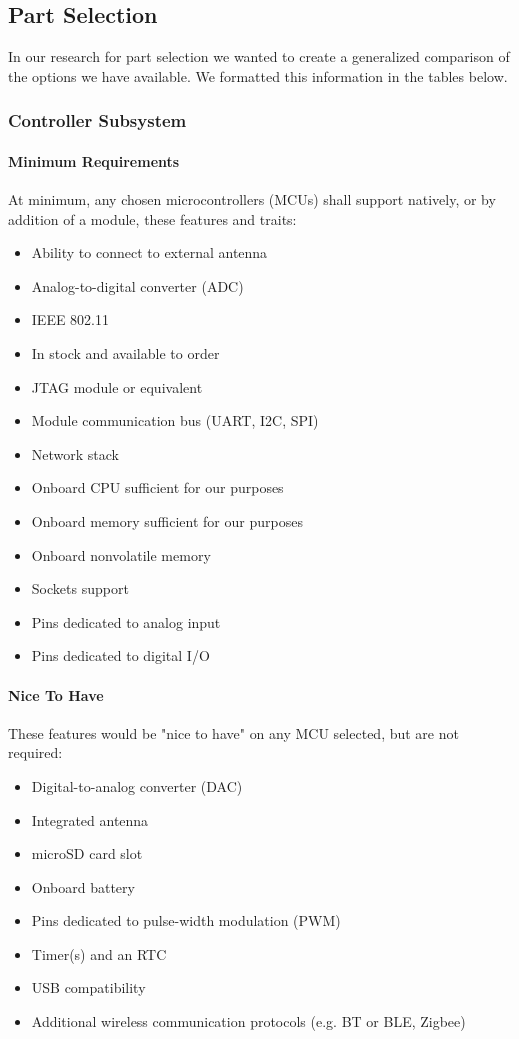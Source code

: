 \subsection{Part Selection}
In our research for part selection we wanted to create a generalized comparison of the options we have available. We formatted this information in the tables below.

\subsubsection{Controller Subsystem}\label{sec:ps-control}
\paragraph{Minimum Requirements} At minimum, any chosen microcontrollers (MCUs) shall support natively, or by addition of a module, these features and traits:
\begin{itemize}
	\item Ability to connect to external antenna
	\item Analog-to-digital converter (ADC)
	\item IEEE 802.11
	\item In stock and available to order
	\item JTAG module or equivalent
	\item Module communication bus (UART, I2C, SPI)
	\item Network stack
	\item Onboard CPU sufficient for our purposes
	\item Onboard memory sufficient for our purposes
	\item Onboard nonvolatile memory
	\item Sockets support
	\item Pins dedicated to analog input
	\item Pins dedicated to digital I/O
\end{itemize}

\paragraph{Nice To Have} These features would be "nice to have" on any MCU selected, but are not required:
\begin{itemize}
	\item Digital-to-analog converter (DAC)
	\item Integrated antenna
	\item microSD card slot
	\item Onboard battery
	\item Pins dedicated to pulse-width modulation (PWM)
	\item Timer(s) and an RTC
	\item USB compatibility
	\item Additional wireless communication protocols (e.g. BT or BLE, Zigbee)
\end{itemize}

